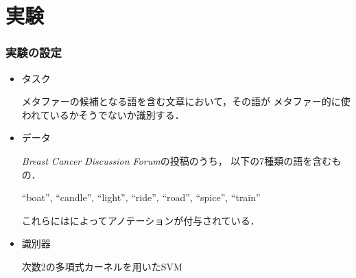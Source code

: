 \documentclass[11pt,usepdftitle=false]{beamer}
\newcommand\papertitle[1]{\textit{#1}}
\let\oldcite=\citet
\renewcommand\citet[1]{\hyperlink{#1}{\oldcite{#1}}}
\begin{document}
\section{実験}
\begin{frame}
    \frametitle{実験の設定}
    \setlength{\leftmargini}{1.3em}
    \begin{itemize}
        \item タスク

            メタファーの候補となる語を含む文章において，その語が
            メタファー的に使われているかそうでないか識別する．

        \item データ

            \papertitle{Breast Cancer Discussion Forum}の投稿のうち，
            以下の7種類の語を含むもの．
            \begin{center}
               “boat”, “candle”, “light”, “ride”, “road”, “spice”, “train”
            \end{center}
            これらには\citet{jang2015}によってアノテーションが付与されている．

        \item 識別器

            次数2の多項式カーネルを用いたSVM

    \end{itemize}
\end{frame}
\end{document}
